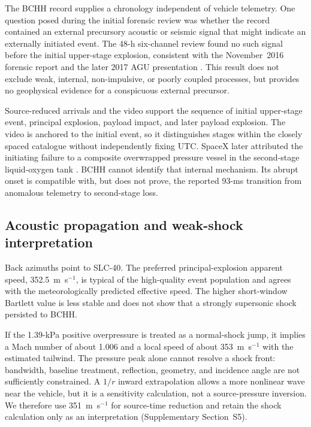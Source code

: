 \documentclass[]{seismica}
\begin{document}
The BCHH record supplies a chronology independent of vehicle telemetry. One
question posed during the initial forensic review was whether the record
contained an external precursory acoustic or seismic signal that might indicate
an externally initiated event. The 48-h six-channel review found no such signal
before the initial upper-stage explosion, consistent with the November~2016
forensic report \citep{thompson_mcnutt_fireball_2016} and the later 2017 AGU
presentation \citep{thompson_agu_falcon9_2017}. This result does not exclude
weak, internal, non-impulsive, or poorly coupled processes, but provides no
geophysical evidence for a conspicuous external precursor.

Source-reduced arrivals and the video support the sequence of initial
upper-stage event, principal explosion, payload impact, and later payload
explosion. The video is anchored to the initial event, so it distinguishes
stages within the closely spaced catalogue without independently fixing UTC.
SpaceX later attributed the initiating failure to a composite overwrapped
pressure vessel in the second-stage liquid-oxygen tank
\citep{spacex_anomaly_2017,nasa_sma_falcon9}. BCHH cannot identify that
internal mechanism. Its abrupt onset is compatible with, but does not prove,
the reported 93-ms transition from anomalous telemetry to second-stage loss.

\subsection{Acoustic propagation and weak-shock interpretation}

Back azimuths point to SLC-40. The preferred principal-explosion apparent
speed, 352.5~m~s$^{-1}$, is typical of the high-quality event population and
agrees with the meteorologically predicted effective speed. The higher
short-window Bartlett value is less stable and does not show that a strongly
supersonic shock persisted to BCHH.

If the 1.39-kPa positive overpressure is treated as a normal-shock jump, it
implies a Mach number of about 1.006 and a local speed of about
353~m~s$^{-1}$ with the estimated tailwind. The pressure peak alone cannot
resolve a shock front: bandwidth, baseline treatment, reflection, geometry,
and incidence angle are not sufficiently constrained. A $1/r$ inward
extrapolation allows a more nonlinear wave near the vehicle, but it is a
sensitivity calculation, not a source-pressure inversion. We therefore use
351~m~s$^{-1}$ for source-time reduction and retain the shock calculation only
as an interpretation (Supplementary Section~S5).
\end{document}
